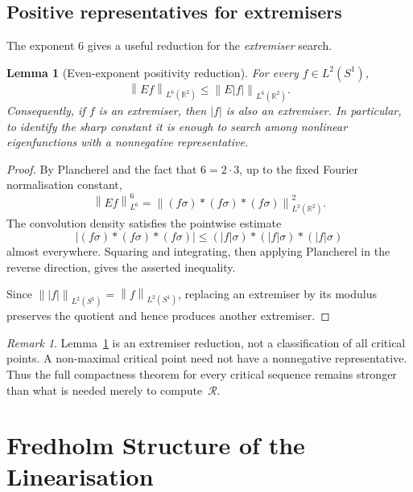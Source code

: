 \documentclass[12pt]{article}
\newtheorem{lemma}[theorem]{Lemma}
\theoremstyle{definition}
\theoremstyle{remark}
\newtheorem{remark}[theorem]{Remark}
\newcommand{\R}{\mathbb{R}}
\newcommand{\abs}[1]{\left|#1\right|}
\newcommand{\norm}[1]{\left\|#1\right\|}
\begin{document}
\subsection{Positive representatives for extremisers}

The exponent $6$ gives a useful reduction for the \emph{extremiser}
search.

\begin{lemma}[Even-exponent positivity reduction]
  \label{lem:positive-reduction}
  For every $f\in L^2(S^1)$,
  \[
    \norm{Ef}_{L^6(\R^2)} \leq \norm{E|f|}_{L^6(\R^2)}.
  \]
  Consequently, if $f$ is an extremiser, then $|f|$ is also an extremiser.
  In particular, to identify the sharp constant it is enough to search
  among nonlinear eigenfunctions with a nonnegative representative.
\end{lemma}

\begin{proof}
  By Plancherel and the fact that $6=2\cdot 3$, up to the fixed Fourier
  normalisation constant,
  \[
    \norm{Ef}_{L^6}^6
    = \norm{(f\sigma)*(f\sigma)*(f\sigma)}_{L^2(\R^2)}^2 .
  \]
  The convolution density satisfies the pointwise estimate
  \[
    \abs{(f\sigma)*(f\sigma)*(f\sigma)}
    \leq (|f|\sigma)*(|f|\sigma)*(|f|\sigma)
  \]
  almost everywhere.  Squaring and integrating, then applying Plancherel
  in the reverse direction, gives the asserted inequality.

  Since $\norm{|f|}_{L^2(S^1)}=\norm{f}_{L^2(S^1)}$, replacing an
  extremiser by its modulus preserves the quotient and hence produces
  another extremiser.
\end{proof}

\begin{remark}
  Lemma~\ref{lem:positive-reduction} is an extremiser reduction, not a
  classification of all critical points.  A non-maximal critical point need
  not have a nonnegative representative.  Thus the full compactness theorem
  for every critical sequence remains stronger than what is needed merely
  to compute~$\mathcal R$.
\end{remark}

\section{Fredholm Structure of the Linearisation}
\label{sec:fredholm}
\end{document}
